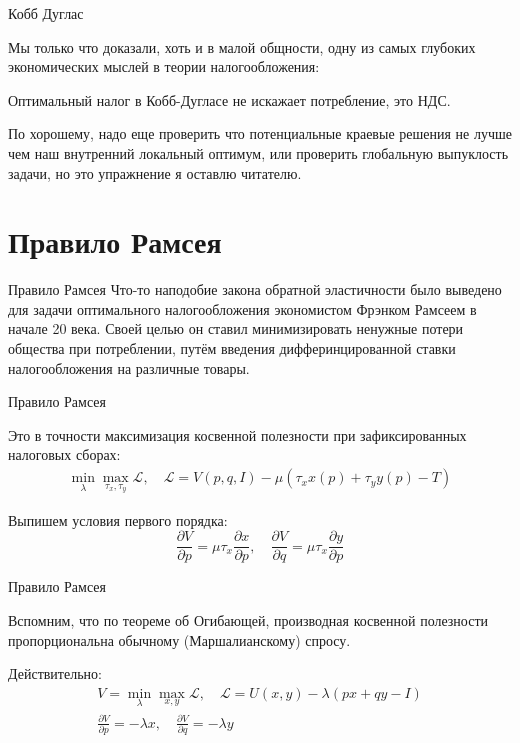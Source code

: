 \documentclass{beamer}
\begin{document}
\begin{frame}{Кобб Дуглас}

Мы только что доказали, хоть и в малой общности, одну из самых глубоких экономических мыслей в теории налогообложения:

\begin{lemma}
Оптимальный налог в Кобб-Дугласе не искажает потребление, это НДС.
\end{lemma}

По хорошему, надо еще проверить что потенциальные краевые решения не лучше чем наш внутренний локальный оптимум, или проверить глобальную выпуклость задачи, но это упражнение я оставлю читателю.

\end{frame}

\section{Правило Рамсея}

\begin{frame}{Правило Рамсея}
Что-то наподобие закона обратной эластичности было выведено для задачи оптимального налогообложения экономистом Фрэнком Рамсеем в начале 20 века. Своей целью он ставил минимизировать ненужные потери общества при потреблении, путём введения дифферинцированной ставки налогообложения на различные товары. 
\end{frame}

\begin{frame}{Правило Рамсея}

Это в точности максимизация косвенной полезности при зафиксированных налоговых сборах:
\begin{gather*}
\min_{\lambda} \max_{\tau_x, \tau_y} \mathcal{L}, \quad \mathcal{L} = V(p,q,I) - \mu (\tau_x x(p) + \tau_y y(p) - T)
\end{gather*}

Выпишем условия первого порядка:
$$\frac{\partial V}{\partial p} = \mu \tau_x \frac{\partial x}{\partial p}, \quad \frac{\partial V}{\partial q} = \mu \tau_x \frac{\partial y}{\partial p}$$

\end{frame}

\begin{frame}{Правило Рамсея}

Вспомним, что по теореме об Огибающей, производная косвенной полезности пропорциональна обычному (Маршалианскому) спросу. 

Действительно:
\begin{gather*}
V = \min_{\lambda} \max_{x,y} \mathcal{L}, \quad \mathcal{L} = U(x, y) - \lambda (p x + q y - I) \\
\frac{\partial V}{\partial p} = - \lambda x, \quad \frac{\partial V}{\partial q} = - \lambda y
\end{gather*}

\end{frame}
\end{document}

